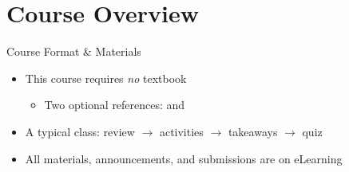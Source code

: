
\section{Course Overview}

\begin{frame}{ Course Format \& Materials}
    \begin{itemize}
        \item[\faIcon{book}] This course requires \textit{no} textbook
        \begin{itemize}
            \item Two optional references: \citet{laudon_laudon_2026} and \citet{kroenke_boyle_2025}
        \end{itemize}
        \item[\faIcon{comments}] A typical class: review $\rightarrow$ activities $\rightarrow$ takeaways $\rightarrow$ quiz
        \item[\faIcon{chalkboard-teacher}] All materials, announcements, and submissions are on eLearning
    \end{itemize}
\end{frame}

